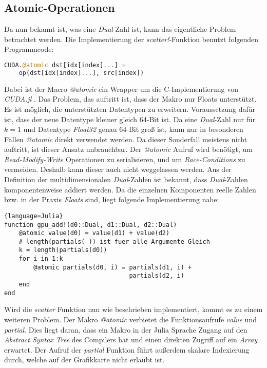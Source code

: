 \subsection{Atomic-Operationen} \label{sec:atomic}

Da nun bekannt ist, was eine \textit{Dual}-Zahl ist, 
kann das eigentliche Problem betrachtet werden.
Die Implementierung der \textit{scatter!}-Funktion benutzt folgenden Programmcode:

\begin{lstlisting}[language=Julia]
CUDA.@atomic dst[idx[index]...] = 
	op(dst[idx[index]...], src[index])  
\end{lstlisting}

Dabei ist der Macro \textit{@atomic} ein Wrapper um die C-Implementierung von \textit{CUDA.jl} \cite{besard2018juliagpu}.
Das Problem, das auftritt ist, dass der Makro nur Floats unterstützt.
Es ist möglich, die unterstützten Datentypen zu erweitern.
Voraussetzung dafür ist, dass der neue Datentype kleiner gleich 64-Bit ist.
Da eine \textit{Dual}-Zahl nur für $k = 1$ und Datentype \textit{Float32} genau 64-Bit groß ist,
kann nur in besonderen Fällen \textit{@atomic} direkt verwendet werden.
Da dieser Sonderfall meistens nicht auftritt, ist dieser Ansatz unbrauchbar.
Der \textit{@atomic} Aufruf wird benötigt,
um \textit{Read-Modify-Write} Operationen zu serialisieren, 
und um \textit{Race-Conditions} zu vermeiden. 
Deshalb kann dieser auch nicht weggelassen werden.
Aus der Definition der multidimensionalen \textit{Dual}-Zahlen 
ist bekannt, dass \textit{Dual}-Zahlen komponentenweise addiert werden.
Da die einzelnen Komponenten reelle Zahlen 
bzw. in der Praxis \textit{Floats} sind, liegt folgende Implementierung nahe:
\begin{lstlisting}{language=Julia}
function gpu_add!(d0::Dual, d1::Dual, d2::Dual)
	@atomic value(d0) = value(d1) + value(d2)
    # length(partials( )) ist fuer alle Argumente Gleich
	k = length(partials(d0)) 
	for i in 1:k
		@atomic partials(d0, i) = partials(d1, i) + 
                                  partials(d2, i)
	end
end

\end{lstlisting}

Wird die \textit{scatter} Funktion nun wie beschrieben implementiert, kommt es zu einem weiteren Problem.
Der Makro \textit{@atomic} verbietet die Funktionsaufrufe \textit{value} und \textit{partial}.
Dies liegt daran, dass ein Makro in der Julia Sprache Zugang auf den \textit{Abstract Syntax Tree} des Compilers hat
und einen direkten Zugriff auf ein \textit{Array} erwartet.
Der Aufruf der \textit{partial} Funktion führt außerdem skalare Indexierung durch, welche auf der Grafikkarte nicht erlaubt ist.